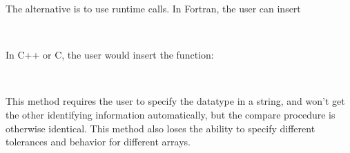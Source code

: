 The alternative is to use runtime calls.
In Fortran, the user can insert
\begin{otabbing}
\> \\
\>
\end{otabbing}
In C++ or C, the user would insert the function:
\begin{otabbing}
\> \\
\>
\end{otabbing}
This method requires the user to specify the datatype in a string, and won't get the other identifying information automatically, but the compare procedure is otherwise identical.
This method also loses the ability to specify different tolerances and behavior for different arrays.

